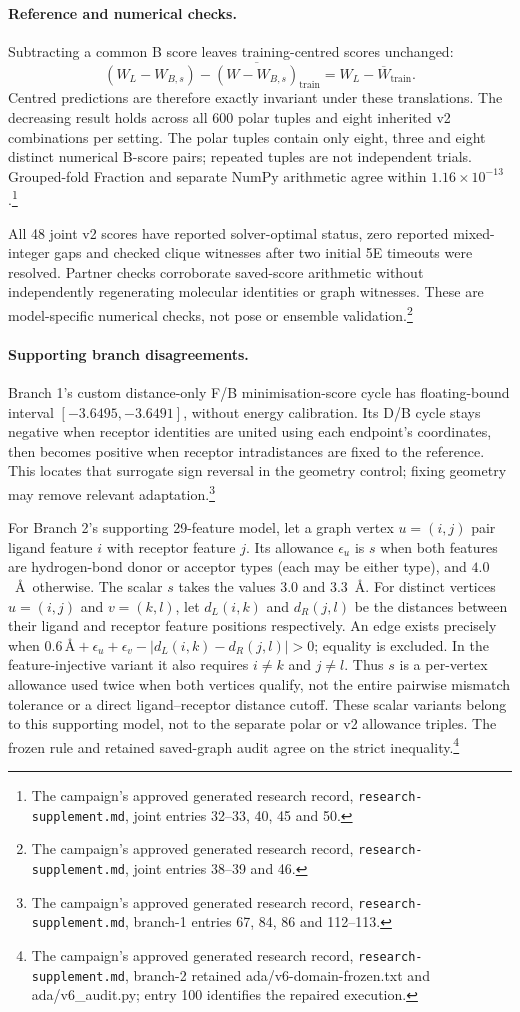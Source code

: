 \documentclass{article}
\newcommand{\rr}[1]{\footnote{The campaign's approved generated research record, \texttt{research-supplement.md}, #1.}}
\begin{document}
\paragraph{Reference and numerical checks.}
Subtracting a common B score leaves training-centred scores unchanged:
\[
 (W_L-W_{B,s})-\overline{(W-W_{B,s})}_{\mathrm{train}}
 =W_L-\overline W_{\mathrm{train}}.
\]
Centred predictions are therefore exactly invariant under these translations. The decreasing result holds across all 600 polar tuples and eight inherited v2 combinations per setting. The polar tuples contain only eight, three and eight distinct numerical B-score pairs; repeated tuples are not independent trials. Grouped-fold Fraction and separate NumPy arithmetic agree within \(1.16\times10^{-13}\).\rr{joint entries 32--33, 40, 45 and 50}

All 48 joint v2 scores have reported solver-optimal status, zero reported mixed-integer gaps and checked clique witnesses after two initial 5E timeouts were resolved. Partner checks corroborate saved-score arithmetic without independently regenerating molecular identities or graph witnesses. These are model-specific numerical checks, not pose or ensemble validation.\rr{joint entries 38--39 and 46}

\paragraph{Supporting branch disagreements.}
Branch 1's custom distance-only F/B minimisation-score cycle has floating-bound interval \([-3.6495,-3.6491]\), without energy calibration. Its D/B cycle stays negative when receptor identities are united using each endpoint's coordinates, then becomes positive when receptor intradistances are fixed to the reference. This locates that surrogate sign reversal in the geometry control; fixing geometry may remove relevant adaptation.\rr{branch-1 entries 67, 84, 86 and 112--113}

For Branch 2's supporting 29-feature model, let a graph vertex \(u=(i,j)\) pair ligand feature \(i\) with receptor feature \(j\). Its allowance \(\epsilon_u\) is \(s\) when both features are hydrogen-bond donor or acceptor types (each may be either type), and \(4.0\)~\AA\ otherwise. The scalar \(s\) takes the values \(3.0\) and \(3.3\)~\AA. For distinct vertices \(u=(i,j)\) and \(v=(k,l)\), let \(d_L(i,k)\) and \(d_R(j,l)\) be the distances between their ligand and receptor feature positions respectively. An edge exists precisely when \(0.6\,\text{\AA}+\epsilon_u+\epsilon_v-|d_L(i,k)-d_R(j,l)|>0\); equality is excluded. In the feature-injective variant it also requires \(i\ne k\) and \(j\ne l\). Thus \(s\) is a per-vertex allowance used twice when both vertices qualify, not the entire pairwise mismatch tolerance or a direct ligand--receptor distance cutoff. These scalar variants belong to this supporting model, not to the separate polar or v2 allowance triples. The frozen rule and retained saved-graph audit agree on the strict inequality.\rr{branch-2 retained ada/v6-domain-frozen.txt and ada/v6\_audit.py; entry 100 identifies the repaired execution}
\end{document}
